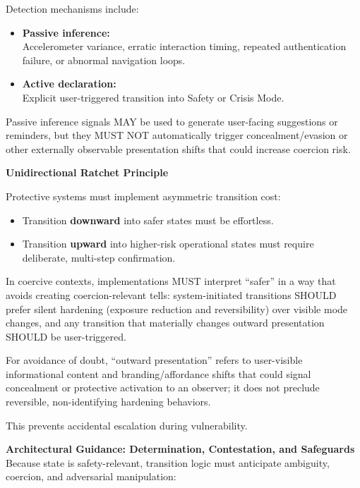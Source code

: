 \documentclass[12pt]{article}
\begin{document}
Detection mechanisms include:

\begin{itemize}
\item \textbf{Passive inference:}\\
  Accelerometer variance, erratic interaction timing, repeated authentication failure, or abnormal navigation loops.
\item \textbf{Active declaration:}\\
  Explicit user-triggered transition into Safety or Crisis Mode.
\end{itemize}

Passive inference signals MAY be used to generate user-facing suggestions or reminders, but they MUST NOT automatically trigger concealment/evasion or other externally observable presentation shifts that could increase coercion risk.

\textbf{Unidirectional Ratchet Principle}

Protective systems must implement asymmetric transition cost:

\begin{itemize}
\item Transition \textbf{downward} into safer states must be effortless.
\item Transition \textbf{upward} into higher-risk operational states must require deliberate, multi-step confirmation.
\end{itemize}

In coercive contexts, implementations MUST interpret ``safer'' in a way that avoids creating coercion-relevant tells: system-initiated transitions SHOULD prefer silent hardening (exposure reduction and reversibility) over visible mode changes, and any transition that materially changes outward presentation SHOULD be user-triggered.

For avoidance of doubt, ``outward presentation'' refers to user-visible informational content and branding/affordance shifts that could signal concealment or protective activation to an observer; it does not preclude reversible, non-identifying hardening behaviors.

This prevents accidental escalation during vulnerability.

\textbf{Architectural Guidance: Determination, Contestation, and Safeguards}\\
Because state is safety-relevant, transition logic must anticipate ambiguity, coercion, and adversarial manipulation:
\end{document}
